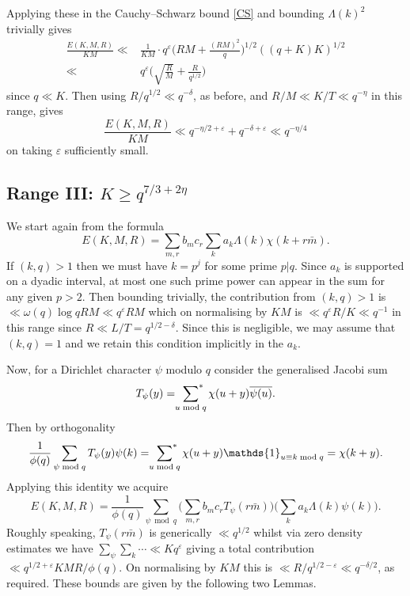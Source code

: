 \documentclass[12pt, oneside]{amsart}
\theoremstyle{definition}
\newcommand{\ol}{\overline}
\newcommand{\geqs}{\geqslant }
\newcommand{\eps}{\varepsilon}
\newcommand{\1}{\mathds{1}}
\begin{document}
Applying these in the Cauchy--Schwarz bound \eqref{CS} and bounding $\Lambda(k)^2$ trivially gives 
\begin{align*}
\frac{E(K,M,R)}{KM}
\ll &
 \frac{1}{KM}\cdot q^\eps 
 \bigg(RM+\frac{(RM)^2}{q}\bigg)^{1/2} 
  ((q+K)K)^{1/2} 
 \\
 \ll & {q^\eps}\bigg(\sqrt{\frac{R}{M}}+\frac{R}{q^{1/2}}\bigg)
\end{align*}
since $q\ll K$. Then using $R/q^{1/2}\ll q^{-\delta}$, as before, and $R/M\ll K/T\ll q^{-\eta}$ in this range, gives 
\begin{equation}\label{II}
\frac{E(K,M,R)}{KM}
\ll q^{-\eta/2+\eps}+q^{-\delta+\eps}\ll q^{-\eta/4}
\end{equation}
on taking $\eps$ sufficiently small. 


\subsection{Range III: $K\geqs q^{7/3+2\eta}$} We start again from the formula
\[
E(K,M,R)
=
\sum_{m,r}b_mc_r\sum_k a_k\Lambda(k)\chi(k+r\bar m).
\]
If $(k,q)>1$ then we must have $k=p^j$ for some prime $p|q$. Since $a_k$ is supported on a dyadic interval, at most one such prime power can appear in the sum for any given $p>2$. Then bounding trivially, the contribution from $(k,q)>1$ is $\ll \omega(q)\log q RM\ll q^\eps RM$ which on normalising by $KM$ is $\ll q^\eps R/K\ll q^{-1}$ in this range since $R\ll L/T=q^{1/2-\delta}$. Since this is negligible, we may assume that $(k,q)=1$ and we retain this condition implicitly in the $a_k$.  

Now, for a Dirichlet character $\psi$ modulo $q$ consider the generalised Jacobi sum 
\[
T_\psi(y)=\sideset{}{^*}\sum_{u\bmod q}\chi(u+y)\ol{\psi(u)}. 
\]
Then by orthogonality
\[
\frac{1}{\phi(q)}\sum_{\psi\bmod q}T_\psi(y)\psi(k)
=
\sideset{}{^*}\sum_{u\bmod q}\chi(u+y)\mathds{1}_{u\equiv k\bmod q}
=
\chi(k+y).
\]
Applying this identity we acquire
\begin{equation}\label{E III}
E(K,M,R)
=
\frac{1}{\phi(q)}\sum_{\psi\bmod q}\bigg(\sum_{m,r}b_mc_rT_\psi(r\bar m)\bigg)\bigg(\sum_k a_k\Lambda(k)\psi(k)\bigg).
\end{equation}
Roughly speaking, $T_\psi(r\bar m)$ is generically $\ll q^{1/2}$ whilst via zero density estimates we have $\sum_{\psi}\sum_k\cdots \ll Kq^\eps$ giving a total contribution $\ll q^{1/2+\eps}KMR/\phi(q)$. On normalising by $KM$ this is $\ll R/q^{1/2-\eps}\ll q^{-\delta/2}$, as required. These bounds are given by the following two Lemmas.  
\end{document}
